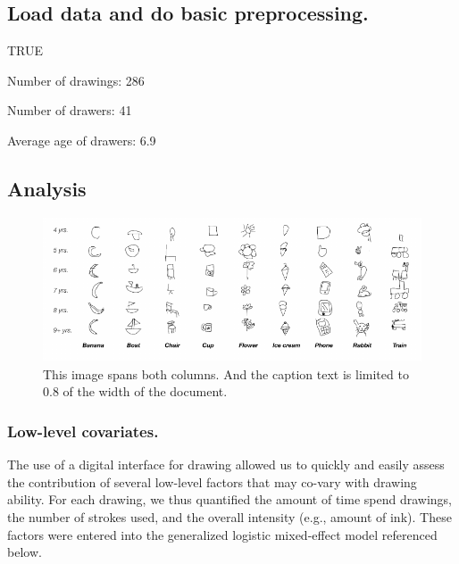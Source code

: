 \documentclass[10pt, letterpaper]{article}
\newenvironment{CodeChunk}{}{}
\begin{document}
\subsection{Load data and do basic
preprocessing.}\label{load-data-and-do-basic-preprocessing.}

\begin{CodeChunk}
\begin{CodeOutput}
[1] TRUE
\end{CodeOutput}
\end{CodeChunk}

Number of drawings: 286

Number of drawers: 41

Average age of drawers: 6.9

\subsection{Analysis}\label{analysis}

\begin{CodeChunk}
\begin{figure}[h]

{\centering \includegraphics{figs/2-col-image-1} 

}

\caption[This image spans both columns]{This image spans both columns. And the caption text is limited to 0.8 of the width of the document.}\label{fig:2-col-image}
\end{figure}
\end{CodeChunk}

\subsubsection{Low-level covariates.}\label{low-level-covariates.}

The use of a digital interface for drawing allowed us to quickly and
easily assess the contribution of several low-level factors that may
co-vary with drawing ability. For each drawing, we thus quantified the
amount of time spend drawings, the number of strokes used, and the
overall intensity (e.g., amount of ink). These factors were entered into
the generalized logistic mixed-effect model referenced below.
\end{document}

